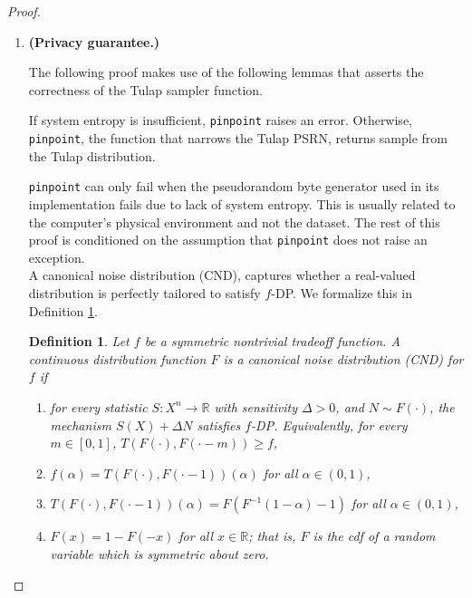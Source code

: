 \documentclass{article}
\newtheorem{defn}{Definition}
\begin{document}
\begin{proof} 
\hfill
\begin{enumerate}
    \item \textbf{(Privacy guarantee.)} 

\begin{tcolorbox}
    \begin{note}
    The following proof makes use of the following lemmas that asserts the correctness of the Tulap sampler function.
    \begin{lemma}
        If system entropy is insufficient, \texttt{pinpoint} raises an error. 
        Otherwise, \texttt{pinpoint}, the function that narrows the Tulap PSRN, 
        returns sample from the Tulap distribution.
    \end{lemma}
    \end{note}
\end{tcolorbox}

\texttt{pinpoint} can only fail when the pseudorandom byte generator used in its implementation fails due to lack of system entropy. 
This is usually related to the computer's physical environment and not the dataset. 
The rest of this proof is conditioned on the assumption that \texttt{pinpoint} does not raise an exception. \\

A canonical noise distribution (CND)\parencite{awan2023canonical}, 
captures whether a real-valued distribution is perfectly tailored to satisfy $f$-DP\parencite{dong2019gaussian}. 
We formalize this in Definition \ref{def2}\parencite{awan2023canonical}. 
\begin{defn}\label{def2}  %
Let $f$ be a symmetric nontrivial tradeoff function. A {continuous} distribution function $F$ is a \emph{canonical noise distribution} (CND) for $f$ if 
\begin{enumerate}[(1)]
    \item for every statistic $S: X^n\rightarrow \mathbb{R}$ with sensitivity $\Delta>0$, and $N\sim F(\cdot)$, 
        the mechanism $S(X) + \Delta N$ satisfies $f$-DP. Equivalently, for every $m\in [0,1]$, $T(F(\cdot),F(\cdot-m))\geq f$,
    \item $f(\alpha)=T(F(\cdot),F(\cdot-1))(\alpha)$ for all $\alpha \in (0,1)$,
    \item $T(F(\cdot),F(\cdot-1))(\alpha) = F(F^{-1}(1-\alpha)-1)$ for all $\alpha \in (0,1)$,
    \item $F(x) = 1-F(-x)$ for all $x\in \mathbb{R}$; that is, $F$ is the cdf of a random variable which is symmetric about zero.
\end{enumerate}
\end{defn}


\end{enumerate}
\end{proof}
\end{document}
